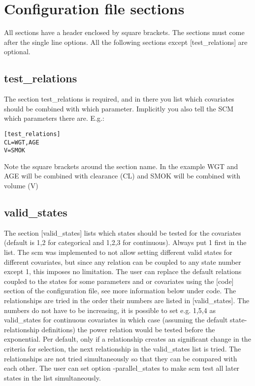 \documentclass[a4paper,12pt]{article}
\begin{document}
\section{Configuration file sections}
All sections have a header enclosed by square brackets. The sections must come after the single line options. All the following sections except [test\_relations] are optional. 

\subsection{test\_relations}
The section test\_relations is required, and in there you list which covariates should be combined with which parameter. Implicitly you also tell the SCM which parameters there are. E.g.:

\begin{verbatim}
[test_relations]
CL=WGT,AGE
V=SMOK
\end{verbatim}

Note the square brackets around the section name. In the example WGT and AGE will be combined with clearance (CL) and SMOK will be combined with volume (V)

\subsection{valid\_states}
The section [valid\_states] lists which states should be tested for the covariates (default is 1,2 for categorical and 1,2,3 for continuous). Always put 1 first in the list. The scm was implemented to not allow setting different valid states for different covariates, but since any relation can be coupled to any state number except 1, this imposes no limitation. The user can replace the default relations coupled to the states for some parameters and or covariates using the [code] section of the configuration file, see more information below under code. The relationships are tried in the order their numbers are listed in [valid\_states]. The numbers do not have to be increasing, it is possible to set e.g. 1,5,4 as valid\_states for continuous covariates in which case (assuming the default state-relationship definitions) the power relation would be tested before the exponential. Per default, only if a relationship creates an significant change in the criteria for selection, the next relationship in the valid\_states list is tried. The relationships are not tried simultaneously so that they can be compared with each other. The user can set option -parallel\_states to make scm test all later states in the list simultaneously.
\end{document}
